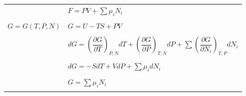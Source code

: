\documentclass[11pt]{article}
\begin{document}
\begin{table}
\begin{center}
\begin{tabular}{ll}
 & $F = PV +\sum \mu_i N_i $  \\ \\
\hline
    $G = G(T,P,N)$ & $G = U - TS + PV$ \\ \\
  & $dG = \left ( \dfrac{\partial G}{\partial T} \right )_{P,N}
    dT + \left ( \dfrac{\partial
      G}{\partial P}\right )_{T,N} dP + \sum \left (
      \dfrac{\partial G}{\partial N_i} \right )_{T,P} dN_i$  \\ \\
 & $dG = -S dT + V dP + \sum  \mu_i dN_i $\\ \\
 & $G = \sum \mu_i N_i $  \\ \\
\hline
  \end{tabular}
  \end{center}
\end{table}
\end{document}
